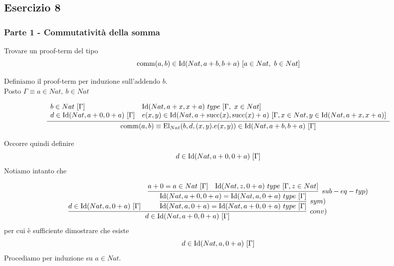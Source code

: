 \subsection{Esercizio 8}
\subsubsection{Parte 1 - Commutatività della somma}
\begin{thm}
	Trovare un proof-term del tipo
	\[ \mathrm{comm}(a, b) \in \mathrm{Id}(Nat, a+b, b+a)\ [a\in Nat,\ b\in Nat] \]
\end{thm}
\proof
Definiamo il proof-term per induzione sull'addendo $b$.\\
Posto $\Gamma \equiv a\in Nat,\ b\in Nat$

\begin{scriptsize}
	\[ \infer{\mathrm{comm}(a, b) \equiv \mathrm{El}_{Nat}(b, d, (x, y).e(x,y)) \in \Id{Nat}{a+b}{b+a}\ [\Gamma]}{\begin{array}{ll} b\in Nat\ [\Gamma] & \Id{Nat}{a+x}{x+a}\ type\ [\Gamma,\ x\in Nat] \\ d\in \Id{Nat}{a+0}{0+a}\ [\Gamma] & e(x, y)\in \Id{Nat}{a+\suc{x}}{\suc{x}+a}\ [\Gamma, x\in Nat, y\in \Id{Nat}{a+x}{x+a}]\end{array}} \]
\end{scriptsize}

Occorre quindi definire 
\[ d\in \mathrm{Id}(Nat, a+0, 0+a)\ [\Gamma] \]
Notiamo intanto che

\[ \infer[conv)]{d\in \Id{Nat}{a+0}{0+a}\ [\Gamma]}
{	d\in \Id{Nat}{a}{0+a}\ [\Gamma] & 
	\infer[sym)]{\Id{Nat}{a}{0+a} = \Id{Nat}{a+0}{0+a}\ type\ [\Gamma]}
	{
		\infer[sub-eq-typ)]{\Id{Nat}{a+0}{0+a}=\Id{Nat}{a}{0+a}\ type\ [\Gamma]}
		{a+0 = a\in Nat\ [\Gamma] & \Id{Nat}{z}{0+a}\ type\ [\Gamma, z\in Nat]}
	}
}
\]
per cui è sufficiente dimostrare che esiste
\[ d\in \mathrm{Id}(Nat, a, 0+a)\ [\Gamma]\]
Procediamo per induzione su $a\in Nat$.


